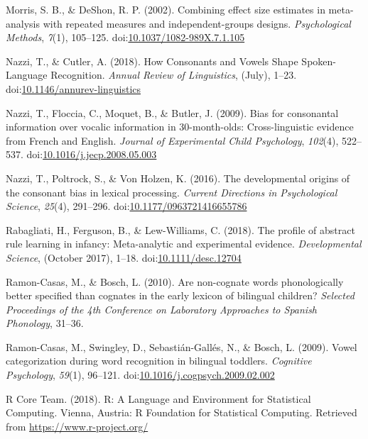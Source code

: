 \documentclass[man]{apa6}
\begin{document}
\leavevmode\hypertarget{ref-morris2002combining}{}%
Morris, S. B., \& DeShon, R. P. (2002). Combining effect size estimates in meta-analysis with repeated measures and independent-groups designs. \emph{Psychological Methods}, \emph{7}(1), 105--125. doi:\href{https://doi.org/10.1037/1082-989X.7.1.105}{10.1037/1082-989X.7.1.105}

\leavevmode\hypertarget{ref-Nazzi2018}{}%
Nazzi, T., \& Cutler, A. (2018). How Consonants and Vowels Shape Spoken-Language Recognition. \emph{Annual Review of Linguistics}, (July), 1--23. doi:\href{https://doi.org/10.1146/annurev-linguistics}{10.1146/annurev-linguistics}

\leavevmode\hypertarget{ref-Nazzi2009a}{}%
Nazzi, T., Floccia, C., Moquet, B., \& Butler, J. (2009). Bias for consonantal information over vocalic information in 30-month-olds: Cross-linguistic evidence from French and English. \emph{Journal of Experimental Child Psychology}, \emph{102}(4), 522--537. doi:\href{https://doi.org/10.1016/j.jecp.2008.05.003}{10.1016/j.jecp.2008.05.003}

\leavevmode\hypertarget{ref-Nazzi2016}{}%
Nazzi, T., Poltrock, S., \& Von Holzen, K. (2016). The developmental origins of the consonant bias in lexical processing. \emph{Current Directions in Psychological Science}, \emph{25}(4), 291--296. doi:\href{https://doi.org/10.1177/0963721416655786}{10.1177/0963721416655786}

\leavevmode\hypertarget{ref-Rabagliati2018}{}%
Rabagliati, H., Ferguson, B., \& Lew-Williams, C. (2018). The profile of abstract rule learning in infancy: Meta-analytic and experimental evidence. \emph{Developmental Science}, (October 2017), 1--18. doi:\href{https://doi.org/10.1111/desc.12704}{10.1111/desc.12704}

\leavevmode\hypertarget{ref-Ramon-Casas2010}{}%
Ramon-Casas, M., \& Bosch, L. (2010). Are non-cognate words phonologically better specified than cognates in the early lexicon of bilingual children? \emph{Selected Proceedings of the 4th Conference on Laboratory Approaches to Spanish Phonology}, 31--36.

\leavevmode\hypertarget{ref-Ramon-Casas2009}{}%
Ramon-Casas, M., Swingley, D., Sebastián-Gallés, N., \& Bosch, L. (2009). Vowel categorization during word recognition in bilingual toddlers. \emph{Cognitive Psychology}, \emph{59}(1), 96--121. doi:\href{https://doi.org/10.1016/j.cogpsych.2009.02.002}{10.1016/j.cogpsych.2009.02.002}

\leavevmode\hypertarget{ref-R}{}%
R Core Team. (2018). R: A Language and Environment for Statistical Computing. Vienna, Austria: R Foundation for Statistical Computing. Retrieved from \url{https://www.r-project.org/}
\end{document}
